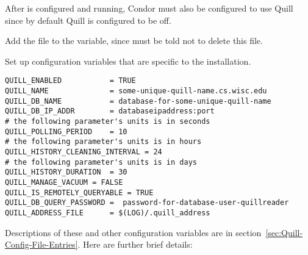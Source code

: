 After  is configured and running, Condor must also be
configured to use Quill since by default Quill is configured to be off.

\begin{description}
\item Add the file  to the 
   variable, since  must
  be told not to delete this file.
\item Set up configuration variables that are specific
  to the installation.
\footnotesize
\begin{verbatim}
QUILL_ENABLED           = TRUE
QUILL_NAME              = some-unique-quill-name.cs.wisc.edu
QUILL_DB_NAME           = database-for-some-unique-quill-name
QUILL_DB_IP_ADDR        = databaseipaddress:port
# the following parameter's units is in seconds
QUILL_POLLING_PERIOD    = 10
# the following parameter's units is in hours
QUILL_HISTORY_CLEANING_INTERVAL = 24
# the following parameter's units is in days
QUILL_HISTORY_DURATION 	= 30
QUILL_MANAGE_VACUUM = FALSE
QUILL_IS_REMOTELY_QUERYABLE = TRUE
QUILL_DB_QUERY_PASSWORD =  password-for-database-user-quillreader
QUILL_ADDRESS_FILE      = $(LOG)/.quill_address
\end{verbatim}
\normalsize

\end{description}


Descriptions of these and other configuration variables are in
section~\ref{sec:Quill-Config-File-Entries}.
Here are further brief details:

